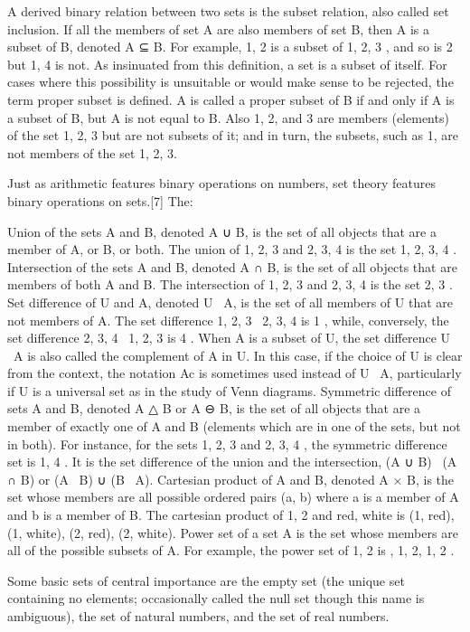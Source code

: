 \documentclass{article}
\begin{document}
A derived binary relation between two sets is the subset relation, also called set inclusion. If all the members of set A are also members of set B, then A is a subset of B, denoted A ⊆ B. For example, {1, 2} is a subset of {1, 2, 3} , and so is {2} but {1, 4} is not. As insinuated from this definition, a set is a subset of itself. For cases where this possibility is unsuitable or would make sense to be rejected, the term proper subset is defined. A is called a proper subset of B if and only if A is a subset of B, but A is not equal to B. Also 1, 2, and 3 are members (elements) of the set {1, 2, 3} but are not subsets of it; and in turn, the subsets, such as {1}, are not members of the set {1, 2, 3}.

Just as arithmetic features binary operations on numbers, set theory features binary operations on sets.[7] The:

    Union of the sets A and B, denoted A ∪ B, is the set of all objects that are a member of A, or B, or both. The union of {1, 2, 3} and {2, 3, 4} is the set {1, 2, 3, 4} .
    Intersection of the sets A and B, denoted A ∩ B, is the set of all objects that are members of both A and B. The intersection of {1, 2, 3} and {2, 3, 4} is the set {2, 3} .
    Set difference of U and A, denoted U \ A, is the set of all members of U that are not members of A. The set difference {1, 2, 3} \ {2, 3, 4} is {1} , while, conversely, the set difference {2, 3, 4} \ {1, 2, 3} is {4} . When A is a subset of U, the set difference U \ A is also called the complement of A in U. In this case, if the choice of U is clear from the context, the notation Ac is sometimes used instead of U \ A, particularly if U is a universal set as in the study of Venn diagrams.
    Symmetric difference of sets A and B, denoted A △ B or A ⊖ B, is the set of all objects that are a member of exactly one of A and B (elements which are in one of the sets, but not in both). For instance, for the sets {1, 2, 3} and {2, 3, 4} , the symmetric difference set is {1, 4} . It is the set difference of the union and the intersection, (A ∪ B) \ (A ∩ B) or (A \ B) ∪ (B \ A).
    Cartesian product of A and B, denoted A × B, is the set whose members are all possible ordered pairs (a, b) where a is a member of A and b is a member of B. The cartesian product of {1, 2} and {red, white} is {(1, red), (1, white), (2, red), (2, white)}.
    Power set of a set A is the set whose members are all of the possible subsets of A. For example, the power set of {1, 2} is { {}, {1}, {2}, {1, 2} } .

Some basic sets of central importance are the empty set (the unique set containing no elements; occasionally called the null set though this name is ambiguous), the set of natural numbers, and the set of real numbers.
\end{document}
